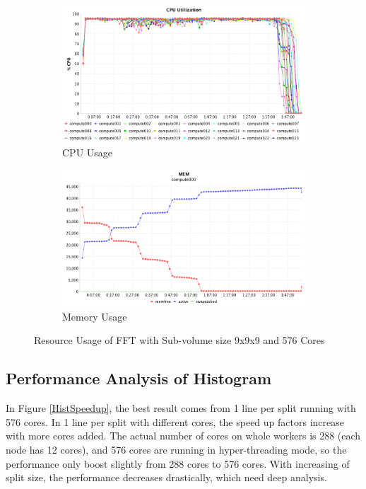 \begin{figure}[!ht]
\centering
\begin{subfigure}{1\textwidth}
  \centering
  \includegraphics[width=1\linewidth]{figures/FFT474_576_CPU.png}
  \caption{CPU Usage}
  \label{FFT474_576_CPU}
\end{subfigure}
\begin{subfigure}{1\textwidth}
  \centering
  \includegraphics[width=1\linewidth]{figures/FFT474_576_MEM.png}
  \caption{Memory Usage}
  \label{FFT474_576_MEM}
\end{subfigure}
\caption{Resource Usage of FFT with Sub-volume size 9x9x9 and 576 Cores}
\label{FFT474_576}
\end{figure}


\subsection{Performance Analysis of Histogram}

In Figure \ref{HistSpeedup}, the best result comes from 1 line per split running with 576 cores. In 1 line per split with different cores, the speed up factors increase with more cores added. The actual number of cores on whole workers is 288 (each node has 12 cores), and 576 cores are running in hyper-threading mode, so the performance only boost slightly from 288 cores to 576 cores. With increasing of split size, the performance decreases drastically, which need deep analysis. 

